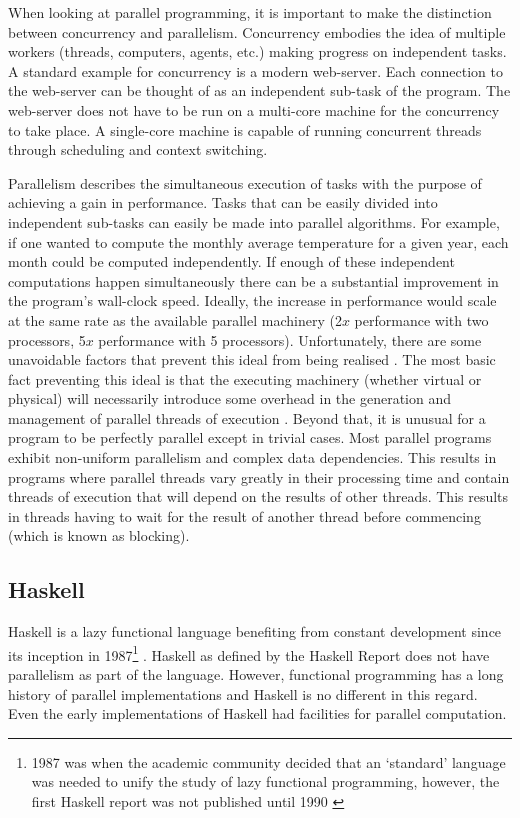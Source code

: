 When looking at parallel programming, it is important to make the distinction
between concurrency and parallelism.  Concurrency embodies the idea of multiple
workers (threads, computers, agents, etc.) making progress on independent
tasks. A standard example for concurrency is a modern web-server. Each
connection to the web-server can be thought of as an independent sub-task of
the program. The web-server does not have to be run on a multi-core machine for
the concurrency to take place. A single-core machine is capable of running
concurrent threads through scheduling and context switching.

Parallelism describes the simultaneous execution of tasks with the purpose of
achieving a gain in performance. Tasks that can be easily divided into
independent sub-tasks can easily be made into parallel algorithms. For example,
if one wanted to compute the monthly average temperature for a given year, each
month could be computed independently.  If enough of these independent
computations happen simultaneously there can be a substantial improvement in
the program's wall-clock speed. Ideally, the increase in performance would
scale at the same rate as the available parallel machinery (2$x$ performance
with two processors, 5$x$ performance with 5 processors). Unfortunately, there
are some unavoidable factors that prevent this ideal from being realised
\citep{hughes:thesis,HistoryOfHaskell,PFPAnIntro}. The most basic fact
preventing this ideal is that the executing machinery (whether virtual or
physical) will necessarily introduce some overhead in the generation and
management of parallel threads of execution \citep{PeytonJones:IFL}. Beyond
that, it is unusual for a program to be perfectly parallel except in trivial
cases. Most parallel programs exhibit non-uniform parallelism and complex data
dependencies. This results in programs where parallel threads vary greatly in
their processing time and contain threads of execution that will depend on the
results of other threads. This results in threads having to wait for the result
of another thread before commencing (which is known as blocking).

\subsection{Haskell}

Haskell is a lazy functional language benefiting from constant development
since its inception in 1987\footnote{1987 was when the academic community
decided that an `standard' language was needed to unify the study of lazy
functional programming\citep{HistoryOfHaskell}, however, the first Haskell
report was not published until 1990 \citep{Haskell98Book}}
\citep{HistoryOfHaskell, Haskell98Book}. Haskell as defined by the Haskell
Report \citep{Haskell98Book} does not have parallelism as part of the language.
However, functional programming has a long history of parallel implementations
and Haskell is no different in this regard. Even the early implementations of
Haskell had facilities for parallel computation.

